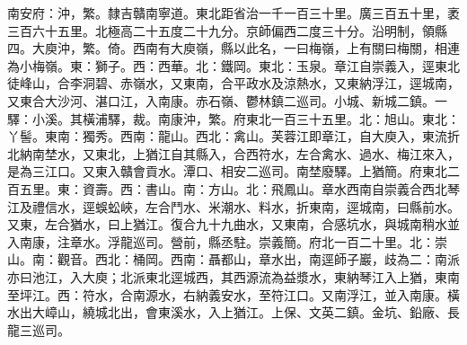 \begin{pinyinscope}
南安府：沖，繁。隸吉贛南寧道。東北距省治一千一百三十里。廣三百五十里，袤三百六十五里。北極高二十五度二十九分。京師偏西二度三十分。沿明制，領縣四。大庾沖，繁。倚。西南有大庾嶺，縣以此名，一曰梅嶺，上有關曰梅關，相連為小梅嶺。東：獅子。西：西華。北：鐵岡。東北：玉泉。章江自崇義入，逕東北徒峰山，合李洞碧、赤嶺水，又東南，合平政水及涼熱水，又東納浮江，逕城南，又東合大沙河、湛口江，入南康。赤石嶺、鬱林鎮二巡司。小城、新城二鎮。一驛：小溪。其橫浦驛，裁。南康沖，繁。府東北一百三十五里。北：旭山。東北：丫髻。東南：獨秀。西南：龍山。西北：禽山。芙蓉江即章江，自大庾入，東流折北納南埜水，又東北，上猶江自其縣入，合西符水，左合禽水、過水、梅江來入，是為三江口。又東入贛會貢水。潭口、相安二巡司。南埜廢驛。上猶簡。府東北二百五里。東：資壽。西：書山。南：方山。北：飛鳳山。章水西南自崇義合西北琴江及禮信水，逕蜈蚣峽，左合鬥水、米潮水、料水，折東南，逕城南，曰縣前水。又東，左合猶水，曰上猶江。復合九十九曲水，又東南，合感坑水，與城南稍水並入南康，注章水。浮龍巡司。營前，縣丞駐。崇義簡。府北一百二十里。北：崇山。南：觀音。西北：桶岡。西南：聶都山，章水出，南逕師子巖，歧為二：南派亦曰池江，入大庾；北派東北逕城西，其西源流為益漿水，東納琴江入上猶，東南至坪江。西：符水，合南源水，右納義安水，至符江口。又南浮江，並入南康。橫水出大嶂山，繞城北出，會東溪水，入上猶江。上保、文英二鎮。金坑、鉛廠、長龍三巡司。


\end{pinyinscope}